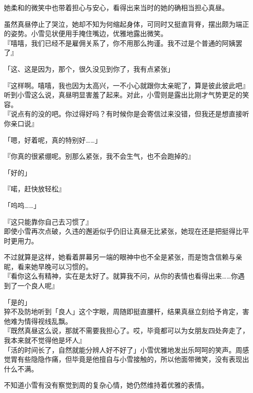 她柔和的微笑中也带着担心与安心，看得出来当时的她的确相当担心真昼。

虽然真昼停止了哭泣，她却不知为何缩起身体，可同时又挺直背脊，摆出颇为端正的姿势。小雪见状便用手掩住嘴边，优雅地露出微笑。\\

『嘻嘻，我们已经不是雇佣关系了，你不用那么拘谨。我不过是个普通的阿姨罢了』

「这、这是因为，那个，很久没见到你了，我有点紧张」

『这样啊。嘻嘻，我也因为太高兴，一不小心就跟你太亲昵了，算是彼此彼此吧』\\

听到小雪这么说，真昼明显害羞了起来。对此，小雪则是露出比刚才气势更足的笑容。\\

『说点有的没的吧。你过得好吗？有时候你是会寄信过来没错，但我还是想直接听你亲口说』

「嗯，好着呢，真的特别好……」

『你真的很紧绷呢。别那么紧张，我不会生气，也不会跑掉的』

「好的」

『喏，赶快放轻松』

「呜呜……」

『这只能靠你自己去习惯了』\\

即使小雪再次点破，久违的邂逅似乎仍旧让真昼无比紧张，她现在还是把挺得比平时更用力。

不过就算是这样，她看着屏幕另一端的眼神中也不全是紧张，而是饱含信赖与亲昵，看来她早晚可以习惯的。\\

『看你这么有精神，实在是太好了。就算我不问，从你的表情也看得出来……你遇到了一个良人呢』

「是的」\\

猝不及防地听到「良人」这个字眼，周随即挺直腰杆，结果真昼立刻给予肯定，害他难为情得视线乱飘。\\

『既然真昼这么说，那就不需要我担心了。哎，毕竟都可以为女朋友四处奔走了，我本来就不觉得他是坏人』\\

「活的时间长了，自然就能分辨人好不好了」小雪优雅地发出乐呵呵的笑声。周感觉胃有些隐隐作痛，但毕竟是他擅自与小雪接触的，所以他面带微笑，没有表现出什么不满。

不知道小雪有没有察觉到周的复杂心情，她仍然维持着优雅的表情。\\

